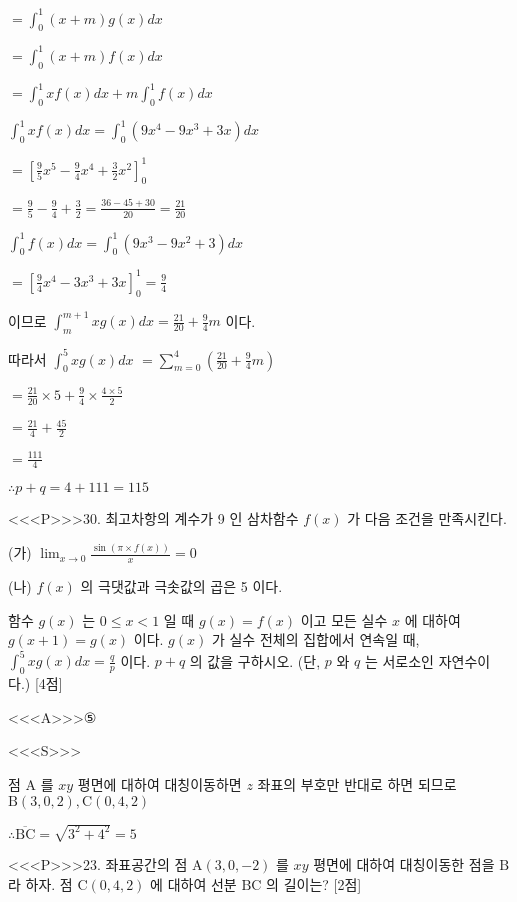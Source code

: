 \documentclass{oblivoir}
\begin{document}
$=\int_{0}^{1}(x+m) g(x) d x$

$=\int_{0}^{1}(x+m) f(x) d x$

$=\int_{0}^{1} x f(x) d x+m \int_{0}^{1} f(x) d x$

$\int_{0}^{1} x f(x) d x=\int_{0}^{1}\left(9 x^{4}-9 x^{3}+3 x\right) d x$

$=\left[\frac{9}{5} x^{5}-\frac{9}{4} x^{4}+\frac{3}{2} x^{2}\right]_{0}^{1}$

$=\frac{9}{5}-\frac{9}{4}+\frac{3}{2}=\frac{36-45+30}{20}=\frac{21}{20}$

$\int_{0}^{1} f(x) d x=\int_{0}^{1}\left(9 x^{3}-9 x^{2}+3\right) d x$

$=\left[\frac{9}{4} x^{4}-3 x^{3}+3 x\right]_{0}^{1}=\frac{9}{4}$

이므로 $\int_{m}^{m+1} x g(x) d x=\frac{21}{20}+\frac{9}{4} m$ 이다.

따라서 $\int_{0}^{5} x g(x) d x $
$=\sum_{m=0}^{4}\left(\frac{21}{20}+\frac{9}{4} m\right)$

$=\frac{21}{20} \times 5+\frac{9}{4} \times \frac{4 \times 5}{2}$

$=\frac{21}{4}+\frac{45}{2}$

$=\frac{111}{4}$

$\therefore p+q=4+111=115$


<<<P>>>30. 최고차항의 계수가 9 인 삼차함수 $f(x)$ 가 다음 조건을 만족시킨다.

(가) $\lim _{x \rightarrow 0} \frac{\sin (\pi \times f(x))}{x}=0$

(나) $f(x)$ 의 극댓값과 극솟값의 곱은 5 이다.

함수 $g(x)$ 는 $0 \leq x<1$ 일 때 $g(x)=f(x)$ 이고 모든 실수 $x$ 에 대하여 $g(x+1)=g(x)$ 이다.
$g(x)$ 가 실수 전체의 집합에서 연속일 때, $\int_{0}^{5} x g(x) d x=\frac{q}{p}$ 이다. $p+q$ 의 값을 구하시오. (단, $p$ 와 $q$ 는 서로소인 자연수이다.) [4점]



<<<A>>>⑤

<<<S>>>



점 $\mathrm{A}$ 를 $x y$ 평면에 대하여 대칭이동하면 $z$ 좌표의 부호만 반대로 하면 되므로 $\mathrm{B}(3,0,2), \mathrm{C}(0,4,2)$

$\therefore \overline{\mathrm{BC}}=\sqrt{3^{2}+4^{2}}=5$


<<<P>>>23. 좌표공간의 점 $\mathrm{A}(3,0,-2)$ 를 $x y$ 평면에 대하여 대칭이동한 점을 $\mathrm{B}$ 라 하자. 점 $\mathrm{C}(0,4,2)$ 에 대하여 선분 $\mathrm{BC}$ 의 길이는? [2점]
\end{document}
